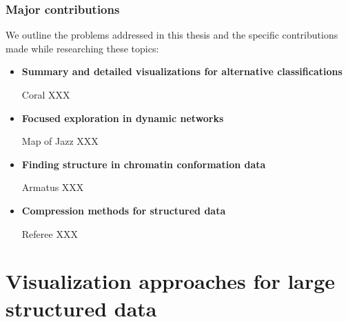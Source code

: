 \documentclass[12pt]{cmuthesis}
\begin{document}




\section{Major contributions}

We outline the problems addressed in this thesis and the specific contributions made while researching these topics:

\begin{itemize}
  \item \textbf{Summary and detailed visualizations for alternative classifications}

  Coral XXX


  \item \textbf{Focused exploration in dynamic networks}

  Map of Jazz XXX

  \item \textbf{Finding structure in chromatin conformation data}

  Armatus XXX

  \item \textbf{Compression methods for structured data}

  Referee XXX

\end{itemize}

\part{Visualization approaches for large structured data}
\end{document}
